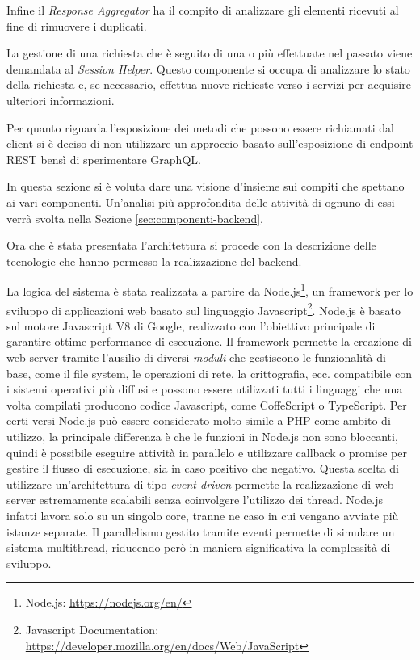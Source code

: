 Infine il \emph{Response Aggregator} ha il compito di analizzare gli elementi ricevuti al fine di rimuovere i duplicati.

La gestione di una richiesta che è seguito di una o più effettuate nel passato viene demandata al \emph{Session Helper}. Questo componente si occupa di analizzare lo stato della richiesta e, se necessario, effettua nuove richieste verso i servizi per acquisire ulteriori informazioni.

Per quanto riguarda l'esposizione dei metodi che possono essere richiamati dal client si è deciso di non utilizzare un approccio basato sull'esposizione di endpoint REST bensì di sperimentare GraphQL.

In questa sezione si è voluta dare una visione d'insieme sui compiti che spettano ai vari componenti. Un'analisi più approfondita delle attività di ognuno di essi verrà svolta nella Sezione \ref{sec:componenti-backend}.

Ora che è stata presentata l'architettura si procede con la descrizione delle tecnologie che hanno permesso la realizzazione del backend.

La logica del sistema è stata realizzata a partire da Node.js\footnote{Node.js: \url{https://nodejs.org/en/}}, un framework per lo sviluppo di applicazioni web basato sul linguaggio Javascript\footnote{Javascript Documentation: \url{https://developer.mozilla.org/en/docs/Web/JavaScript}}. Node.js è basato sul motore Javascript V8 di Google, realizzato con l'obiettivo principale di garantire ottime performance di esecuzione. Il framework permette la creazione di web server tramite l'ausilio di diversi \emph{moduli} che gestiscono le funzionalità di base, come il file system, le operazioni di rete, la crittografia, ecc. \upe compatibile con i sistemi operativi più diffusi e possono essere utilizzati tutti i linguaggi che una volta compilati producono codice Javascript, come CoffeScript o TypeScript. Per certi versi Node.js può essere considerato molto simile a PHP come ambito di utilizzo, la principale differenza è che le funzioni in Node.js non sono bloccanti, quindi è possibile eseguire attività in parallelo e utilizzare callback o promise per gestire il flusso di esecuzione, sia in caso positivo che negativo. Questa scelta di utilizzare un'architettura di tipo \emph{event-driven} permette la realizzazione di web server estremamente scalabili senza coinvolgere l'utilizzo dei thread. Node.js infatti lavora solo su un singolo core, tranne ne caso in cui vengano avviate più istanze separate. Il parallelismo gestito tramite eventi permette di simulare un sistema multithread, riducendo però in maniera significativa la complessità di sviluppo.

